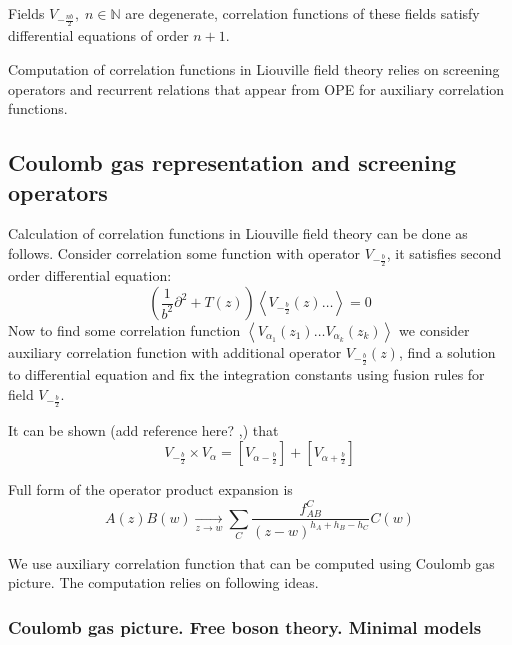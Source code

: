 \documentclass[12pt]{article}
\begin{document}
Fields $V_{-\frac{nb}{2}}, \; n\in \mathbb{N}$ are degenerate, correlation functions of these fields
satisfy differential equations of order $n+1$. 

Computation of correlation functions in Liouville field theory relies on screening operators and
recurrent relations that appear from OPE for auxiliary correlation functions.
\subsection{Coulomb gas representation and screening operators}
\label{sec:coul-gas-repr}

Calculation of correlation functions in Liouville field theory can be done as follows. 
Consider correlation some function with operator $V_{-\frac{b}{2}}$, it satisfies second order
differential equation:
\begin{equation}
  \label{eq:33}
  \left(\frac{1}{b^{2}}\partial^{2}+T(z)\right)\left<V_{-\frac{b}{2}}(z) \dots \right>=0
\end{equation}
Now to find some correlation function $\left<V_{\alpha_{1}}(z_{1})\dots
  V_{\alpha_{k}}(z_{k})\right>$ we consider auxiliary correlation function with additional
operator $V_{-\frac{b}{2}}(z)$, find a solution to differential equation and fix the integration
constants using fusion rules for field $V_{-\frac{b}{2}}$.

It can be shown (add reference here? \cite{nakayama2004liouville},\cite{teschner2001liouville}) that 
\begin{equation}
  \label{eq:34}
  V_{-\frac{b}{2}}\times V_{\alpha}= [V_{\alpha-\frac{b}{2}}]+[V_{\alpha+\frac{b}{2}}]
\end{equation}


Full form of the operator product expansion is
\begin{equation}
  \label{eq:39}
  A(z)B(w)\underset{z\to w}{\longrightarrow} \sum_{C} \frac{f_{AB}^{C}}{(z-w)^{h_{A}+h_{B}-h_{C}}} C(w)
\end{equation}

We use auxiliary correlation function that can be computed using Coulomb gas picture. The
computation relies on following ideas.


\subsubsection{Coulomb gas picture. Free boson theory. Minimal models}
\label{sec:free-boson-minimal-models}
\end{document}
